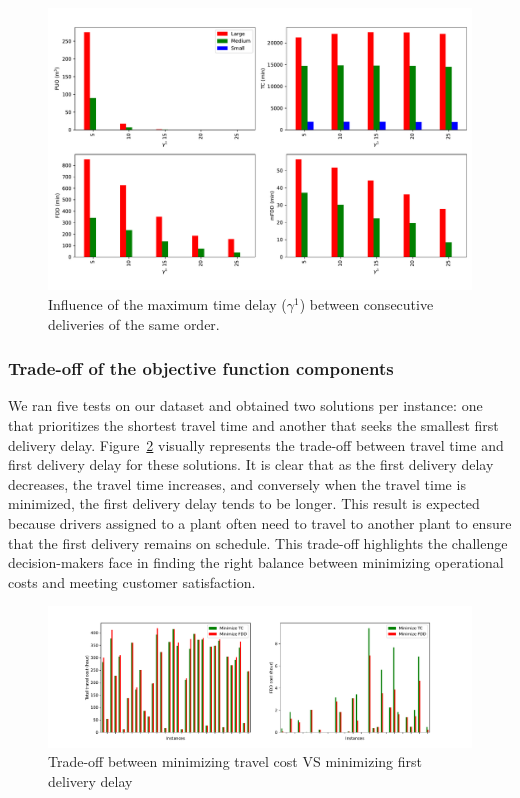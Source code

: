 \begin{figure}[!ht]
    \centering
    \includegraphics[width=1\textwidth]{gamma1.pdf}
    \small
    \caption{Influence of the maximum time delay ($\gamma^1$) between consecutive deliveries of the same order. }
    \label{fig:gamma1_influence}
\end{figure}

\subsubsection{Trade-off of the objective function components}

We ran five tests on our dataset and obtained two solutions per instance: one that prioritizes the shortest travel time and another that seeks the smallest first delivery delay. Figure~\ref{fig:trade_off} visually represents the trade-off between travel time and first delivery delay for these solutions. It is clear that as the first delivery delay decreases, the travel time increases, and conversely when the travel time is minimized, the first delivery delay tends to be longer. This result is expected because drivers assigned to a plant often need to travel to another plant to ensure that the first delivery remains on schedule. This trade-off highlights the challenge decision-makers face in finding the right balance between minimizing operational costs and meeting customer satisfaction.

\begin{figure}[!ht]
    \centering
    \includegraphics[width=1\textwidth]{Trav_FDD.pdf}
    \small
    \caption{Trade-off between minimizing travel cost VS minimizing first delivery delay }
    \label{fig:trade_off}
\end{figure}

